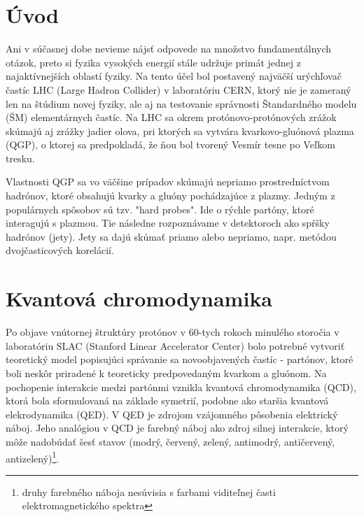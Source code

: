 \documentclass[thesismargins, thesislinespacing]{rnthesis}
\begin{document}
\chapter*{Úvod}
Ani v súčasnej dobe nevieme nájsť odpovede na množstvo fundamentálnych otázok, preto si fyzika vysokých energií stále udržuje primát jednej z najaktívnejších oblastí fyziky. Na tento účel bol postavený najväčší urýchľovač častíc LHC (Large Hadron Collider) v laboratóriu CERN, ktorý nie je zameraný len na štúdium novej fyziky, ale aj na testovanie správnosti Štandardného modelu (ŠM) elementárnych častíc. Na LHC sa okrem protónovo-protónových zrážok skúmajú aj zrážky jadier olova, pri ktorých  sa vytvára kvarkovo-gluónová plazma (QGP), o ktorej sa predpokladá, že ňou bol tvorený Vesmír tesne po Veľkom tresku. 

Vlastnosti QGP sa vo väčšine prípadov skúmajú nepriamo prostredníctvom \-had\-ró\-nov, ktoré obsahujú kvarky a gluóny pochádzajúce z plazmy. Jedným z populárnych \-spô\-so\-bov sú tzv. "hard probes". Ide o rýchle partóny, ktoré interagujú s plazmou. Tie následne rozpoznávame v detektoroch ako spŕšky hadrónov (jety). Jety sa dajú skúmať \-pria\-mo alebo nepriamo, napr. metódou dvojčasticových korelácií. 

\chapter{Kvantová chromodynamika}

Po objave vnútornej štruktúry protónov v 60-tych rokoch minulého storočia v laboratóriu SLAC (Stanford Linear Accelerator Center) bolo potrebné vytvoriť teoretický model popisujúci správanie sa novoobjavených častíc - partónov, ktoré boli neskôr priradené k teoreticky predpovedaným kvarkom a gluónom. Na pochopenie interakcie medzi partónmi vznikla kvantová chromodynamika (QCD), ktorá bola sformulovaná na základe symetrií, podobne ako staršia kvantová elekrodynamika (QED). V QED je zdrojom vzájomného pôsobenia elektrický náboj. Jeho analógiou v QCD je farebný náboj ako zdroj silnej interakcie, ktorý môže nadobúdať šesť stavov (modrý, červený, zelený, antimodrý, antičervený, antizelený)\footnote{druhy farebného náboja nesúvisia s farbami viditeľnej časti elektromagnetického spektra}.
\end{document}
